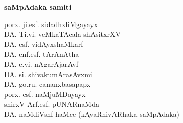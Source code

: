 \begin{center}
{\Large\bf saMpAdaka samiti}

\bigskip
\medskip

{\fontsize{14pt}{16pt}\selectfont
porx. ji.esf. sidadhxliMgayayx\\[7pt]
DA. Ti.vi. veMkaTAcala shAsitxrXV\\[7pt]
DA. esf. vidAyxshaMkarf\\[7pt]
DA. enf.esf. tArAnAtha\\[7pt]
DA. e.vi. nAgarAjarAvf\\[7pt]
DA. si. shivakumArasAvxmi\\[7pt]
DA. go.ru. cananxbasapapx\\[7pt]
porx. esf. naMjuMDayayx\\[7pt]
shirxV Arf.esf. pUNARnaMda\\[7pt]
DA. naMdiVshf haMce (kAyaRnivARhaka saMpAdaka)}\relax
\end{center}

\vfill

\phantom{a}







